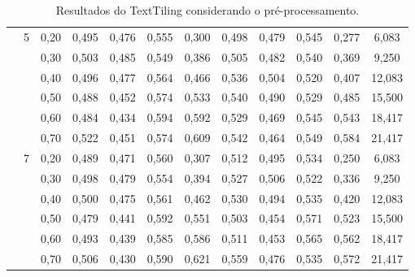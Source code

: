 \begin{table}[!h]
\begin{tabular}{|c|c|c||c|c|c|c||c|c|c|c||c|}
& \multirow{6}{*}{5}                                                                                                                
	  & 0,20    & 0,495 & 0,476 & 0,555 & 0,300         &     0,498 &  0,479 & 0,545 & 0,277 & 6,083               \\ \cline{3-12}  
	 && 0,30    & 0,503 & 0,485 & 0,549 & 0,386         &     0,505 &  0,482 & 0,540 & 0,369 & 9,250               \\ \cline{3-12}  
	 && 0,40    & 0,496 & 0,477 & 0,564 & 0,466         &     0,536 &  0,504 & 0,520 & 0,407 & 12,083              \\ \cline{3-12}  
	 && 0,50    & 0,488 & 0,452 & 0,574 & 0,533         &     0,540 &  0,490 & 0,529 & 0,485 & 15,500              \\ \cline{3-12}  
	 && 0,60    & 0,484 & 0,434 & 0,594 & 0,592         &     0,529 &  0,469 & 0,545 & 0,543 & 18,417              \\ \cline{3-12}  
	 && 0,70    & 0,522 & 0,451 & 0,574 & 0,609         &     0,542 &  0,464 & 0,549 & 0,584 & 21,417              \\ \cline{2-12}  
& \multirow{6}{*}{7}                                                                                                                
	  & 0,20    & 0,489 & 0,471 & 0,560 & 0,307         &     0,512 &  0,495 & 0,534 & 0,250 & 6,083               \\ \cline{3-12}  
	 && 0,30    & 0,498 & 0,479 & 0,554 & 0,394         &     0,527 &  0,506 & 0,522 & 0,336 & 9,250               \\ \cline{3-12}  
	 && 0,40    & 0,500 & 0,475 & 0,561 & 0,462         &     0,530 &  0,494 & 0,535 & 0,420 & 12,083              \\ \cline{3-12}  
	 && 0,50    & 0,479 & 0,441 & 0,592 & 0,551         &     0,503 &  0,454 & 0,571 & 0,523 & 15,500              \\ \cline{3-12}  
	 && 0,60    & 0,493 & 0,439 & 0,585 & 0,586         &     0,511 &  0,453 & 0,565 & 0,562 & 18,417              \\ \cline{3-12}  
	 && 0,70    & 0,506 & 0,430 & 0,590 & 0,621         &     0,559 &  0,476 & 0,535 & 0,572 & 21,417              \\ \hline      
 \end{tabular}  
\caption{Resultados do TextTiling considerando o pré-processamento.}
\end{table} 
